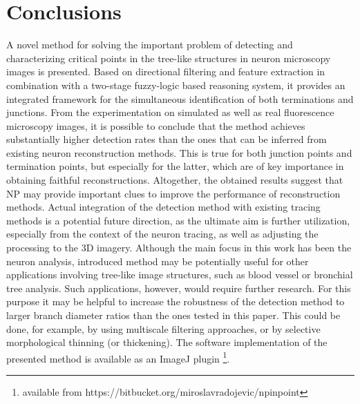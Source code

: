 \section{Conclusions} 
\label{sec:conclusions}
A novel method for solving the important problem of detecting and characterizing critical points in the tree-like structures in neuron microscopy images is presented. Based on directional filtering and feature extraction in combination with a two-stage fuzzy-logic based reasoning system, it provides an integrated framework for the simultaneous identification of both terminations and junctions. From the experimentation on simulated as well as real fluorescence microscopy images, it is possible to conclude that the method achieves substantially higher detection rates than the ones that can be inferred from existing neuron reconstruction methods. This is true for both junction points and termination points, but especially for the latter, which are of key importance in obtaining faithful reconstructions. Altogether, the obtained results suggest that NP may provide important clues to improve the performance of reconstruction methods. Actual integration of the detection method with existing tracing methods is a potential future direction, as the ultimate aim is further utilization, especially from the context of the neuron tracing, as well as adjusting the processing to the 3D imagery. Although the main focus in this work has been the neuron analysis, introduced method may be potentially useful for other applications involving tree-like image structures, such as blood vessel or bronchial tree analysis. Such applications, however, would require further research. For this purpose it may be helpful to increase the robustness of the detection method to larger branch diameter ratios than the ones tested in this paper. This could be done, for example, by using multiscale filtering approaches, or by selective morphological thinning (or thickening). The software implementation of the presented method is available as an ImageJ plugin \footnote{available from https://bitbucket.org/miroslavradojevic/npinpoint}.